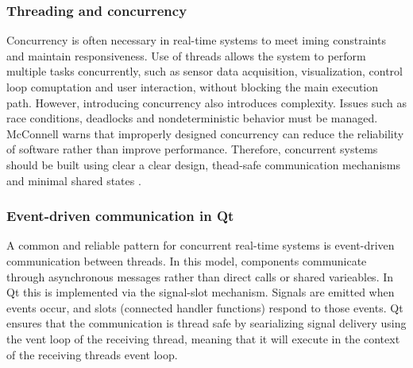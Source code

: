 \subsubsection{Threading and concurrency}
Concurrency is often necessary in real-time systems to meet iming constraints and maintain responsiveness. Use of threads allows the system to perform multiple tasks concurrently, such as sensor data acquisition, visualization, control loop comuptation and user interaction, without blocking the main execution path.
\newline \newline
However, introducing concurrency also introduces complexity. Issues such as race conditions, deadlocks and nondeterministic behavior must be managed. McConnell \cite{mcconnell_code_2004} warns that improperly designed concurrency can reduce the reliability of software rather than improve performance. Therefore, concurrent systems should be built using clear a clear design, thead-safe communication mechanisms and minimal shared states \cite{noauthor_software_nodate}.

\subsubsection{Event-driven communication in Qt}
A common and reliable pattern for concurrent real-time systems is event-driven communication between threads. In this model, components communicate through asynchronous messages rather than direct calls or shared varieables. In Qt this is implemented via the signal-slot mechanism. Signals are emitted when events occur, and slots (connected handler functions) respond to those events. Qt ensures that the communication is thread safe by searializing signal delivery using the vent loop of the receiving thread, meaning that it will execute in the context of the receiving threads event loop. 

